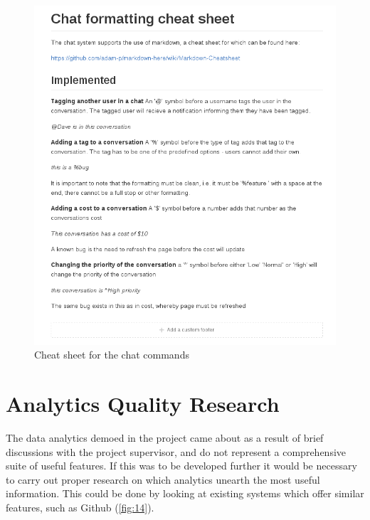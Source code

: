 \documentclass{l4proj}
\begin{document}
\begin{figure}[h]
\includegraphics[scale = 0.7]{cheat-sheet.png}
\centering
\caption{Cheat sheet for the chat commands}
\label{fig:13}
\end{figure}

\newpage

\section{Analytics Quality Research}

The data analytics demoed in the project came about as a result of brief discussions with the project supervisor, and do not represent a comprehensive suite of useful features.  If this was to be developed further it would be necessary to carry out proper research on which analytics unearth the most useful information.  This could be done by looking at existing systems which offer similar features, such as Github (\ref{fig:14}). 
\end{document}
